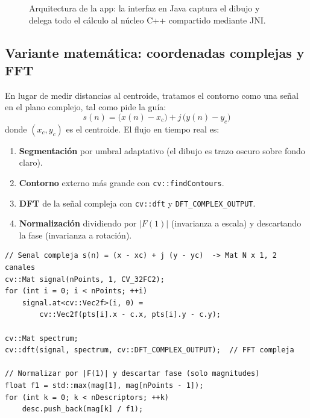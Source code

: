 \documentclass[12pt,a4paper]{article}
\begin{document}
\begin{figure}[htbp]
  \centering
  \caption{Arquitectura de la app: la interfaz en Java captura el dibujo y delega todo el cálculo al núcleo C++ compartido mediante JNI.}
  \label{fig:arq}
\end{figure}

\subsection{Variante matemática: coordenadas complejas y FFT}

En lugar de medir distancias al centroide, tratamos el contorno como una señal en el plano complejo, tal como pide la guía:
\[
s(n) = \big(x(n) - x_c\big) + j\,\big(y(n) - y_c\big)
\]
donde $(x_c, y_c)$ es el centroide. El flujo en tiempo real es:
\begin{enumerate}
  \item \textbf{Segmentación} por umbral adaptativo (el dibujo es trazo oscuro sobre fondo claro).
  \item \textbf{Contorno} externo más grande con \texttt{cv::findContours}.
  \item \textbf{DFT} de la señal compleja con \texttt{cv::dft} y \texttt{DFT\_COMPLEX\_OUTPUT}.
  \item \textbf{Normalización} dividiendo por $|F(1)|$ (invarianza a escala) y descartando la fase (invarianza a rotación).
\end{enumerate}

\begin{lstlisting}
// Senal compleja s(n) = (x - xc) + j (y - yc)  -> Mat N x 1, 2 canales
cv::Mat signal(nPoints, 1, CV_32FC2);
for (int i = 0; i < nPoints; ++i)
    signal.at<cv::Vec2f>(i, 0) =
        cv::Vec2f(pts[i].x - c.x, pts[i].y - c.y);

cv::Mat spectrum;
cv::dft(signal, spectrum, cv::DFT_COMPLEX_OUTPUT);  // FFT compleja

// Normalizar por |F(1)| y descartar fase (solo magnitudes)
float f1 = std::max(mag[1], mag[nPoints - 1]);
for (int k = 0; k < nDescriptors; ++k)
    desc.push_back(mag[k] / f1);
\end{lstlisting}
\end{document}

